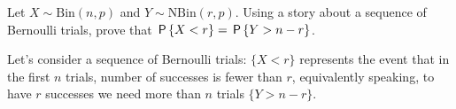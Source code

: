 
\setcounter{theorem}{23}
\begin{exercise} [BH.4.24] Let $X \sim \text{Bin}(n,p)$ and $Y \sim \text{NBin}(r,p)$. Using a story about a sequence of Bernoulli trials, prove that $\P{X < r} = \P{Y > n - r}$.
\begin{solution}
    Let's consider a sequence of Bernoulli trials: $\{X<r\}$ represents the event that in the first $n$ trials, number of successes is fewer than $r$, equivalently speaking, to have $r$ successes we need more than $n$ trials $\{Y>n-r\}$.
\end{solution}
\end{exercise}

